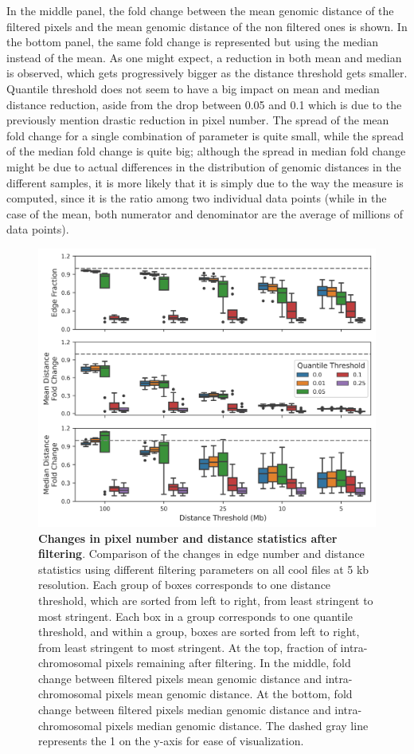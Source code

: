 In the middle panel, the fold change between the mean genomic distance of the filtered pixels and the mean genomic distance of the non filtered ones is shown. In the bottom panel, the same fold change is represented but using the median instead of the mean. As one might expect, a reduction in both mean and median is observed, which gets progressively bigger as the distance threshold gets smaller. Quantile threshold does not seem to have a big impact on mean and median distance reduction, aside from the drop between 0.05 and 0.1 which is due to the previously mention drastic reduction in pixel number. The spread of the mean fold change for a single combination of parameter is quite small, while the spread of the median fold change is quite big; although the spread in median fold change might be due to actual differences in the distribution of genomic distances in the different samples, it is more likely that it is simply due to the way the measure is computed, since it is the ratio among two individual data points (while in the case of the mean, both numerator and denominator are the average of millions of data points).

\begin{figure}[ht]
  \centering
  \includegraphics[width=1\textwidth]{filtering_stats.png}
  \caption{\textbf{Changes in pixel number and distance statistics after filtering}. Comparison of the changes in edge number and distance statistics using different filtering parameters on all cool files at 5 kb resolution. Each group of boxes corresponds to one distance threshold, which are sorted from left to right, from least stringent to most stringent. Each box in a group corresponds to one quantile threshold, and within a group, boxes are sorted from left to right, from least stringent to most stringent. At the top, fraction of intra-chromosomal pixels remaining after filtering. In the middle, fold change between filtered pixels mean genomic distance and intra-chromosomal pixels mean genomic distance. At the bottom, fold change between filtered pixels median genomic distance and intra-chromosomal pixels median genomic distance. The dashed gray line represents the 1 on the y-axis for ease of visualization.}
  \label{fig:filtering}
\end{figure}

